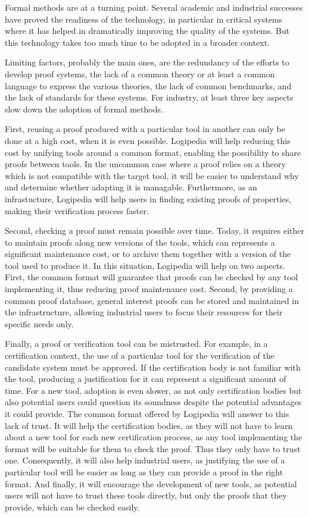 Formal methods are at a turning point. Several academic and
industrial successes have proved the readiness of the technology,
in particular in critical systems where it has helped in
dramatically improving the quality of the systems. But this
technology takes too much time to be adopted in a broader context.

Limiting factors, probably the main ones, are the redundancy of the
efforts to develop proof systems, the lack of a common theory or at
least a common language to express the various theories, the lack of
common benchmarks, and the lack of standards for these systems.  For
industry, at least three key aspects slow down the adoption of formal
methods.

First, reusing a proof produced with a particular tool in another
can only be done at a high cost, when it is even possible.
Logipedia will help reducing this cost by unifying tools
around a common format, enabling the possibility to share proofs
between tools. In the uncommon case where a proof relies on a theory
which is not compatible with the target tool, it will be easier to
understand why and determine whether adapting it is managable.
Furthermore, as an infrastucture, Logipedia will help users
in finding existing proofs of properties, making their verification
process faster.

Second, checking a proof must remain possible over time. Today, it
requires either to maintain proofs along new versions of the tools,
which can represents a significant maintenance cost, or to archive
them together with a version of the tool used to produce it. In this
situation, Logipedia will help on two aspects. First, the
common format will guarantee that proofs can be checked by any tool
implementing it, thus reducing proof maintenance cost. Second, by
providing a common proof database, general interest proofs can be
stored and maintained in the infrastructure, allowing industrial users
to focus their resources for their specific needs only.

Finally, a proof or verification tool can be mistrusted. For example,
in a certification context, the use of a particular tool for the
verification of the candidate system must be approved. If the
certification body is not familiar with the tool, producing a
justification for it can represent a significant amount of time. For
a new tool, adoption is even slower, as not only certification
bodies but also potential users could question its soundness despite
the potential advantages it could provide. The common format offered
by Logipedia will answer to this lack of trust. It will help
the certification bodies, as they will not have to learn about a new
tool for each new certification process, as any tool implementing
the format will be suitable for them to check the proof. Thus they
only have to trust one. Consequently, it will also help industrial
users, as justifying the use of a particular tool will be easier as
long as they can provide a proof in the right format. And finally, it
will encourage the development of new tools, as potential users will
not have to trust these tools directly, but only the proofs that they
provide, which can be checked easily.

